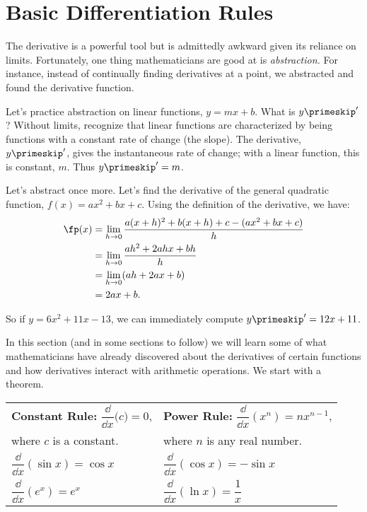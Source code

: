 \section{Basic Differentiation Rules}\label{sec:basic_diff_rules}

The derivative is a powerful tool but is admittedly awkward given its reliance on limits. Fortunately, one thing mathematicians are good at is \emph{abstraction.} For instance, instead of continually finding derivatives at a point, we abstracted and found the derivative function. 

Let's practice abstraction on linear functions, $y=mx+b$. What is $y\primeskip'$? Without limits, recognize that linear functions are characterized by being functions with a constant rate of change (the slope). The derivative, $y\primeskip'$, gives the instantaneous rate of change; with a linear function, this is constant, $m$. Thus $y\primeskip'=m$. 

Let's abstract once more. Let's find the derivative of the general quadratic function, $f(x) = ax^2+bx+c$. Using the definition of the derivative, we have:
\begin{align*}
	\fp(x)
	&=	\lim_{h\to 0}\frac{a(x+h)^2+b(x+h)+c-(ax^2+bx+c)}{h} \\
	&=	\lim_{h\to 0} \frac{ah^2+2ahx+bh}{h} \\
	&=	\lim_{h\to 0}(ah+2ax+b)\\
	&= 2ax+b.
\end{align*}
		
So if $y = 6x^2+11x-13$, we can immediately compute $y\primeskip' = 12x+11$.\bigskip

In this section (and in some sections to follow) we will learn some of what mathematicians have already discovered about the derivatives of certain functions and how derivatives interact with arithmetic operations. We start with a theorem.

\begin{anywhereenum}
\begin{theorem}\label{thm:deriv_common}%
\noindent{}%
\begin{tabular}{ll}
\item \textbf{Constant Rule:}	$\dfrac \dd{\dd x}\bigl( c\bigr) = 0$, &
\item \textbf{Power Rule:} $\dfrac \dd{\dd x}\left(x^n\right) = nx^{n-1}$,\\
\null\qquad where $c$ is a constant. &
\null\qquad where $n$ is any real number.\\
\item $\dfrac \dd{\dd x}(\sin x) = \cos x$ &
\item $\dfrac \dd{\dd x}(\cos x) = -\sin x$ \\[2ex]
\item $\dfrac \dd{\dd x}\left(e^x\right) = e^x$ &
\item $\dfrac \dd{\dd x}(\ln x) = \dfrac1x$
\end{tabular}
\end{theorem}
\end{anywhereenum}

